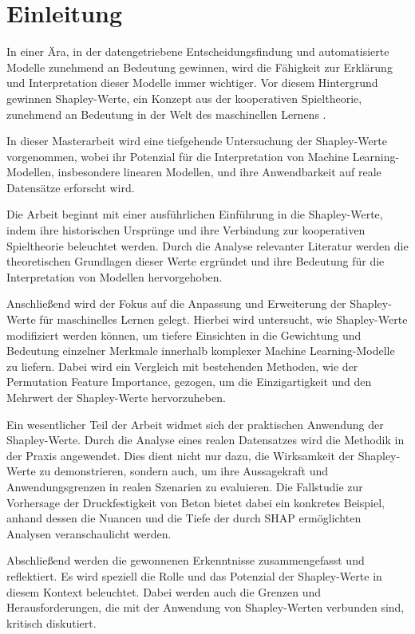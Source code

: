 \chapter{Einleitung}

In einer Ära, in der datengetriebene Entscheidungsfindung und automatisierte Modelle zunehmend an Bedeutung gewinnen, 
wird die Fähigkeit zur Erklärung und Interpretation dieser Modelle immer wichtiger. 
Vor diesem Hintergrund gewinnen 
Shapley-Werte, ein Konzept aus der kooperativen Spieltheorie, zunehmend an Bedeutung in der Welt des maschinellen Lernens \cite[S. 3]{Molnar_2023}. 

In dieser Masterarbeit wird eine tiefgehende Untersuchung der Shapley-Werte vorgenommen, wobei ihr Potenzial für die 
Interpretation von Machine Learning-Modellen, insbesondere linearen Modellen, und ihre Anwendbarkeit auf reale Datensätze 
erforscht wird.

Die Arbeit beginnt mit einer ausführlichen Einführung in die Shapley-Werte, indem ihre historischen Ursprünge 
und ihre Verbindung zur kooperativen Spieltheorie beleuchtet werden. Durch die Analyse relevanter Literatur 
werden die theoretischen Grundlagen dieser Werte ergründet und ihre Bedeutung für die Interpretation von Modellen hervorgehoben.

Anschließend wird der Fokus auf die Anpassung und Erweiterung der Shapley-Werte für maschinelles Lernen gelegt. 
Hierbei wird untersucht, wie Shapley-Werte modifiziert werden können, um tiefere Einsichten in die Gewichtung 
und Bedeutung einzelner Merkmale innerhalb komplexer Machine Learning-Modelle zu liefern. Dabei wird ein Vergleich 
mit bestehenden Methoden, wie der Permutation Feature Importance, gezogen, um die Einzigartigkeit und den Mehrwert der 
Shapley-Werte hervorzuheben.

Ein wesentlicher Teil der Arbeit widmet sich der praktischen Anwendung der Shapley-Werte. Durch die Analyse 
eines realen Datensatzes wird die Methodik in der Praxis angewendet. Dies dient nicht nur dazu, die Wirksamkeit 
der Shapley-Werte zu demonstrieren, sondern auch, um ihre Aussagekraft und Anwendungsgrenzen in realen Szenarien 
zu evaluieren. Die Fallstudie zur Vorhersage der Druckfestigkeit von Beton bietet dabei ein konkretes Beispiel, 
anhand dessen die Nuancen und die Tiefe der durch SHAP ermöglichten Analysen veranschaulicht werden.

Abschließend werden die gewonnenen Erkenntnisse zusammengefasst und reflektiert. Es wird speziell die Rolle und das 
Potenzial der Shapley-Werte in diesem Kontext beleuchtet. Dabei werden auch die Grenzen und Herausforderungen, 
die mit der Anwendung von Shapley-Werten verbunden sind, kritisch diskutiert. 